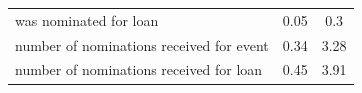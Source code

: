 {\begin{tabular}{l*{1}{cc}}
was nominated for loan                                                                                                                                                                                  &        0.05&        0.3\\
number of nominations received for event                                                                                                                                                                &        0.34&        3.28\\
number of nominations received for loan                                                                                                                                                                 &        0.45&        3.91\\
\hline\hline
\end{tabular}
}

